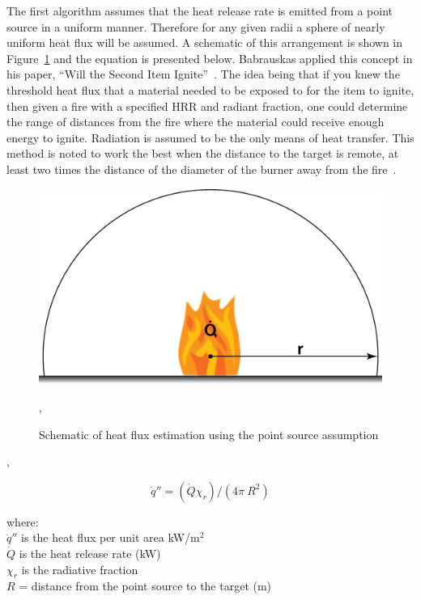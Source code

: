 \documentclass[twoside]{uocthesis}
\begin{document}
{The first algorithm assumes that the heat release rate is emitted from a point source in a uniform manner.  Therefore for any given radii a sphere of nearly uniform heat flux will be assumed. A schematic of this arrangement is shown in Figure~\ref{PointSourceHF} and the equation is presented below. Babrauskas applied this concept in his paper, ``Will the Second Item Ignite''~\cite{Babrauskas:1981}.  The idea being that if you knew the threshold heat flux that a material needed to be exposed to for the item to ignite, then given a fire with a specified HRR and radiant fraction, one could determine the range of distances from the fire where the material could receive enough energy to ignite.  Radiation is assumed to be the only means of heat transfer.  This method is noted to work the best when the distance to the target is remote, at least two times the distance of the diameter of the burner away from the fire~\cite{Hamins:1991,Modak:1977}. 

\begin{figure}
	\centering
	\includegraphics[width=4.5in]{../Figures/PointSourceHF}
	\caption{Schematic of heat flux estimation using the point source assumption}
	\label{PointSourceHF},
\end{figure},

\begin{equation} \label{eq:second_item}
\dot{q}'' = (\dot{Q} \chi_r)/(4 \pi\ R^2)
\end{equation}

\begin{tabbing}
where: \=  \\
{}
\> $\dot{q}''$ is the heat flux per unit area kW/m$^2$\\
\> $\dot{Q}$ is the heat release rate (kW) \\ 
\> $\chi_r$ is the radiative fraction \\
\> $R$ = distance from the point source to the target (m) \\
\end{tabbing}

}
\end{document}
